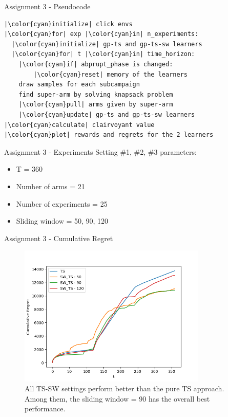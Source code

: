 \documentclass[11pt]{beamer}
\begin{document}
\begin{frame}[fragile]{Assignment 3 - Pseudocode}
\begin{lstlisting}
|\color{cyan}initialize| click envs
|\color{cyan}for| exp |\color{cyan}in| n_experiments:
  |\color{cyan}initialize| gp-ts and gp-ts-sw learners 
  |\color{cyan}for| t |\color{cyan}in| time_horizon:
  	|\color{cyan}if| abprupt_phase is changed:
  		|\color{cyan}reset| memory of the learners
    draw samples for each subcampaign
    find super-arm by solving knapsack problem
    |\color{cyan}pull| arms given by super-arm
    |\color{cyan}update| gp-ts and gp-ts-sw learners
|\color{cyan}calculate| clairvoyant value
|\color{cyan}plot| rewards and regrets for the 2 learners
\end{lstlisting}
\end{frame}

\begin{frame}{Assignment 3 - Experiments}
Setting \#1, \#2, \#3 parameters:
\begin{itemize}
\item T = 360
\item Number of arms = 21
\item Number of experiments = 25
\item Sliding window = 50, 90, 120
\end{itemize}
\end{frame}

\begin{frame}{Assignment 3 -  Cumulative Regret}
\begin{figure}[hbtp]
\centering
\includegraphics[width=0.8\textwidth]{images/assignment_3_exp_1_cum_regret.png}
\caption{All TS-SW settings perform better than the pure TS approach. Among them, the sliding window = 90 has the overall best performance.}
\end{figure}
\end{frame}
\end{document}
